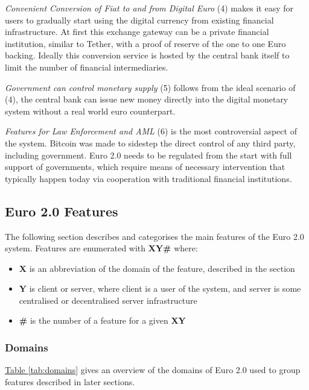 \documentclass[12pt]{article} %
\newcommand{\hypernameref}[1]{\hyperref[#1]{\nameref{#1}}}
\newcommand{\hypertableref}[1]{\hyperref[#1]{Table \ref{#1}}}
\begin{document}
{{\textit{Convenient Conversion of Fiat to and from Digital Euro} (4) makes it easy for users to gradually start using the digital currency from existing financial infrastructure. At first this exchange gateway can be a private financial institution, similar to Tether\cite{tether2016whitepaper}, with a proof of reserve of the one to one Euro backing. Ideally this conversion service is hosted by the central bank itself to limit the number of financial intermediaries.

\textit{Government can control monetary supply} (5) follows from the ideal scenario of (4), the central bank can issue new money directly into the digital monetary system without a real world euro counterpart.

\textit{Features for Law Enforcement and AML} (6) is the most controversial aspect of the system. Bitcoin was made to sidestep the direct control of any third party, including government\cite{nakamoto2008bitcoin}. Euro 2.0 needs to be regulated from the start with full support of governments, which require means of necessary intervention that typically happen today via cooperation with traditional financial institutions.

\subsection{Euro 2.0 Features} \label{ssec:3.3}

The following section describes and categorises the main features of the Euro 2.0 system. Features are enumerated with \textbf{XY\#} where:
\begin{itemize}
	\item \textbf{X} is an abbreviation of the domain of the feature, described in the \hypernameref{sssec:3.3:domains} section
	\item \textbf{Y} is client or server, where client is a user of the system, and server is some centralised or decentralised server infrastructure
	\item \textbf{\#} is the number of a feature for a given \textbf{XY}
\end{itemize}

\subsubsection{Domains} \label{sssec:3.3:domains}

\hypertableref{tab:domains} gives an overview of the domains of Euro 2.0 used to group features described in later sections.

}}
\end{document}
